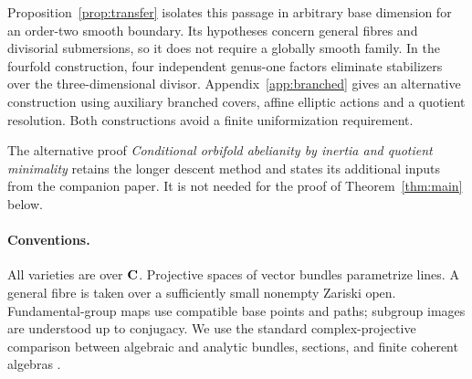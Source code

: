 Proposition~\ref{prop:transfer} isolates this passage in arbitrary base dimension for an order-two smooth boundary. Its hypotheses concern general fibres and divisorial submersions, so it does not require a globally smooth family. In the fourfold construction, four independent genus-one factors eliminate stabilizers over the three-dimensional divisor. Appendix~\ref{app:branched} gives an alternative construction using auxiliary branched covers, affine elliptic actions and a quotient resolution. Both constructions avoid a finite uniformization requirement.

The alternative proof \emph{Conditional orbifold abelianity by inertia and quotient minimality} retains the longer descent method and states its additional inputs from the companion paper. It is not needed for the proof of Theorem~\ref{thm:main} below.

\paragraph{Conventions.}
All varieties are over $\mathbf C$. Projective spaces of vector bundles parametrize lines. A general fibre is taken over a sufficiently small nonempty Zariski open. Fundamental-group maps use compatible base points and paths; subgroup images are understood up to conjugacy. We use the standard complex-projective comparison between algebraic and analytic bundles, sections, and finite coherent algebras \cite{GAGA}.
